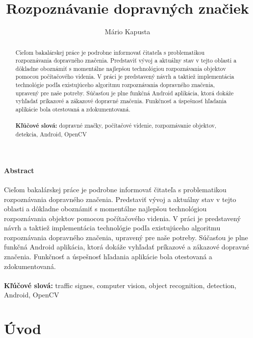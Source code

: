 \documentclass[12pt]{article}
\begin{document}
\title{Rozpoznávanie dopravných značiek}

\author{Mário Kapusta}
\maketitle
\thispagestyle{empty}
\clearpage
\tableofcontents
{}
\thispagestyle{empty}
\clearpage
\listoftables
\thispagestyle{empty}
\clearpage
\listoffigures
\thispagestyle{empty}
\clearpage
\begin{abstract}
Cieľom bakalárskej práce je podrobne informovať čitateľa s problematikou rozpoznávania dopravného značenia.
Predstaviť vývoj a aktuálny stav v tejto oblasti a dôkladne oboznámiť s momentálne najlepšou technológiou rozpoznávania objektov pomocou počítačového videnia.
V práci je predstavený návrh a taktiež implementácia technológie podľa existujúceho algoritmu rozpoznávania dopravného značenia, upravený pre naše potreby.
Súčasťou je plne funkčná Android aplikácia, ktorá dokáže vyhľadať príkazové a zákazové dopravné značenia. Funkčnosť a úspešnosť hľadania aplikácie bola otestovaná a zdokumentovaná.
\\\\
\textbf{Kľúčové slová:} dopravné značky, počítačové videnie, rozpoznávanie objektov, detekcia, Android, OpenCV
\end{abstract}
\clearpage

\centerline{\textbf{Abstract}}
\paragraph{}
Cieľom bakalárskej práce je podrobne informovať čitateľa s problematikou rozpoznávania dopravného značenia.
Predstaviť vývoj a aktuálny stav v tejto oblasti a dôkladne oboznámiť s momentálne najlepšou technológiou rozpoznávania objektov pomocou počítačového videnia.
V práci je predstavený návrh a taktiež implementácia technológie podľa existujúceho algoritmu rozpoznávania dopravného značenia, upravený pre naše potreby.
Súčasťou je plne funkčná Android aplikácia, ktorá dokáže vyhľadať príkazové a zákazové dopravné značenia. Funkčnosť a úspešnosť hľadania aplikácie bola otestovaná a zdokumentovaná.
\\\\
\textbf{Kľúčové slová:} traffic signes, computer vision, object recognition, detection, Android, OpenCV
\clearpage

\section*{Úvod}
\clearpage
\end{document}
